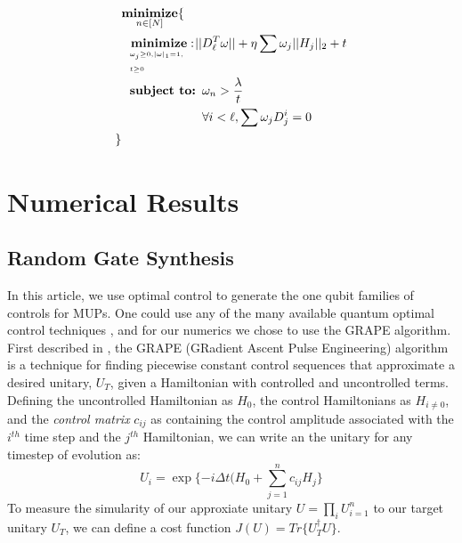 \documentclass[aps,nofootinbib,pra,notitlepage,twocolumn]{revtex4-1}
\begin{document}
\newcommand{\bunderbrace}[2]{%
  \begin{array}[t]{@{}c@{}}
  #1\\
  \parbox{\widthof{#1}}{$\scriptscriptstyle#2$}
  \end{array}
}



\begin{equation}\label{eq:minimization_regularization}
\begin{split}
&\underset{n\in[N]}{\textbf{minimize}}\{\\
&\ \ \bunderbrace{\textbf{minimize}: }{\omega_j\geq0, |\omega|_1=1,\\ t\geq0} ||D_{\ell}^T\omega||+ \eta\sum\omega_j||H_j||_2 + t\\
&\ \ \textbf{subject to: } \omega_n > \frac{\lambda}{t}\\
&\ \ \phantom{\textbf{subject to: }} \forall i<\ell, \sum \omega_jD_j^i=0\\
\}
\end{split}
\end{equation}

\section{Numerical Results}
\label{sec:numerical_results}
\subsection{Random Gate Synthesis}
\label{sec:random_gate_synthesis}
 In this article, we use optimal control to generate the one qubit families of controls for MUPs. One could use any of the many available quantum optimal control techniques \cite{Khaneja2005, Caneva2011, Machnes2018}, and for our numerics we chose to use the GRAPE algorithm. First described in \cite{Khaneja2005}, the GRAPE (GRadient Ascent Pulse Engineering) algorithm is a technique for finding piecewise constant control sequences that approximate a desired unitary, $U_T$, given a Hamiltonian with controlled and uncontrolled terms. Defining the uncontrolled Hamiltonian as $H_0$, the control Hamiltonians as $H_{i\neq 0}$, and the \textit{control matrix} $c_{ij}$ as containing the control amplitude associated with the $i^{th}$ time step and the $j^{th}$ Hamiltonian, we can write an the unitary for any timestep of evolution as:
\begin{equation}\label{eq:3}
  U_i = \exp\{-i\Delta t(H_0 + \sum_{j=1}^{n}c_{ij}H_{j}\}
\end{equation}
To measure the simularity of our approxiate unitary $U=\prod_iU_{i=1}^n$ to our target unitary $U_T$, we can define a cost function $J(U) = Tr\{U_T^{\dagger}U\}$.
\end{document}
